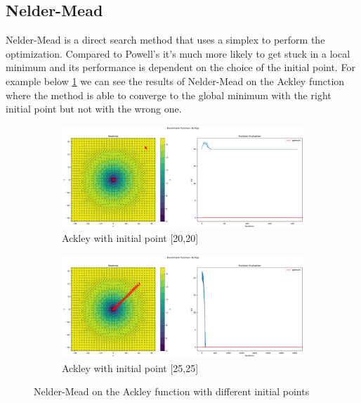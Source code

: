 \subsection{Nelder-Mead}
\label{sec:nelder-mead}
Nelder-Mead is a direct search method that uses a simplex to perform the optimization. Compared to Powell's it's much more likely to get stuck in a local minimum and its performance is dependent on the choice of the initial point. For example below \ref{fig:nm-ackley} we can see the results of Nelder-Mead on the Ackley function where the method is able to converge to the global minimum with the right initial point but not with the wrong one.
\begin{figure}[H]
    \begin{subfigure}{0.5\textwidth}
        \includegraphics[width=\textwidth]{lab1/imgs/nm_ackley_20.png}
        \caption{Ackley with initial point [20,20]}
    \end{subfigure}
    \begin{subfigure}{0.5\textwidth}
        \includegraphics[width=\textwidth]{lab1/imgs/nm_ackley_25.png}
        \caption{Ackley with initial point [25,25]}
    \end{subfigure}
    \caption{Nelder-Mead on the Ackley function with different initial points}
    \label{fig:nm-ackley}
\end{figure}

